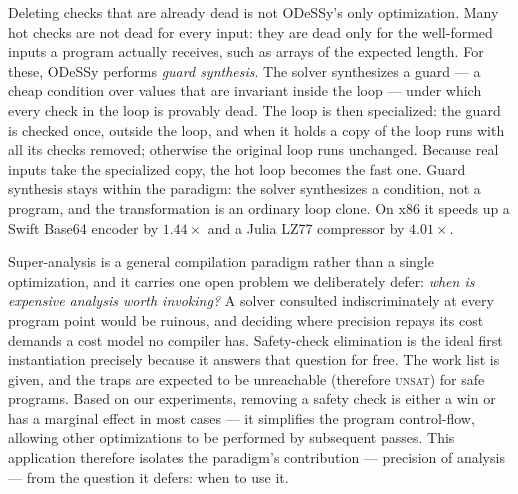 \documentclass[acmsmall,screen,nonacm]{acmart}
\newcommand{\odessy}{ODeSSy}
\newcommand{\tool}{\odessy}
\begin{document}
Deleting checks that are already dead is not \tool{}'s only
optimization. Many hot checks are not dead for every input: they are
dead only for the well-formed inputs a program actually receives, such
as arrays of the expected length. For these, \tool{} performs
\emph{guard synthesis}. The solver synthesizes a guard --- a cheap
condition over values that are invariant inside the loop --- under
which every check in the loop is provably dead. The loop is then
specialized: the guard is checked once, outside the loop, and when it
holds a copy of the loop runs with all its checks removed; otherwise
the original loop runs unchanged. Because real inputs take the
specialized copy, the hot loop becomes the fast one. Guard synthesis
stays within the paradigm: the solver synthesizes a condition, not a
program, and the transformation is an ordinary loop clone. On x86 it
speeds up a Swift Base64 encoder by $1.44\times$ and a Julia LZ77
compressor by $4.01\times$.

Super-analysis is a general compilation paradigm rather than a single
optimization, and it carries one open problem we deliberately defer:
\emph{when is expensive analysis worth invoking?} A solver consulted
indiscriminately at every program point would be ruinous, and deciding
where precision repays its cost demands a cost model no compiler has.
Safety-check elimination is the ideal first instantiation precisely
because it answers that question for free. The work list is given, and the traps are expected to be unreachable (therefore \textsc{unsat}) for safe programs. Based on our experiments, removing a safety check is either a win or has a marginal effect in most cases --- it simplifies the program control-flow, allowing other optimizations to be performed by subsequent passes. This
application therefore isolates the paradigm's contribution --- precision
of analysis --- from the question it defers: when to use it.
\end{document}
